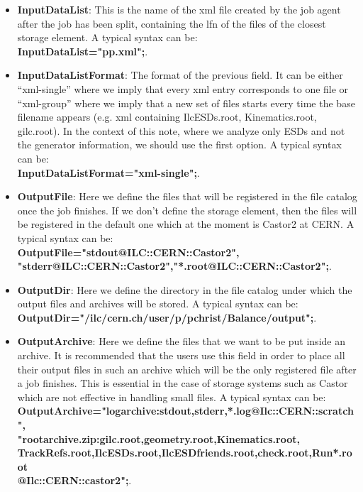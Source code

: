 \begin{itemize}
\item \textbf{InputDataList}: This is the name of the xml file created by the job agent after the job has been split, containing the lfn of the files of the closest storage element. A typical syntax can be: \\{\ttfamily \textbf{InputDataList="pp.xml";}}.

\item \textbf{InputDataListFormat}: The format of the previous field. It can be either ``xml-single'' where we imply that every xml entry corresponds to one file or ``xml-group'' where we imply that a new set of files starts every time the base filename appears (e.g. xml containing IlcESDs.root, Kinematics.root, gilc.root). In the context of this note, where we analyze only ESDs and not the generator information, we should use the first option. A typical syntax can be: \\{\ttfamily \textbf{InputDataListFormat="xml-single";}}. 

\item \textbf{OutputFile}: Here we define the files that will be registered in the file catalog once the job finishes. If we don't define the storage element, then the files will be registered in the default one which at the moment is Castor2 at CERN. A typical syntax can be: \\{\ttfamily \textbf{OutputFile={"stdout@ILC::CERN::Castor2",\\"stderr@ILC::CERN::Castor2","*.root@ILC::CERN::Castor2"};}}. 

\item \textbf{OutputDir}: Here we define the directory in the file catalog under which the output files and archives will be stored. A typical syntax can be: \\{\ttfamily \textbf{OutputDir="/ilc/cern.ch/user/p/pchrist/Balance/output";}}.

\item \textbf{OutputArchive}: Here we define the files that we want to be put inside an archive. It is recommended that the users use this field in order to place all their output files in such an archive which will be the only registered file after a job finishes. This is essential in the case of storage systems such as Castor which are not effective in handling small files. A typical syntax can be: \\{\ttfamily \textbf{OutputArchive={"logarchive:stdout,stderr,*.log@Ilc::CERN::scratch",\\"rootarchive.zip:gilc.root,geometry.root,Kinematics.root,\\TrackRefs.root,IlcESDs.root,IlcESDfriends.root,check.root,Run*.root\\@Ilc::CERN::castor2"};}}.


\end{itemize}
